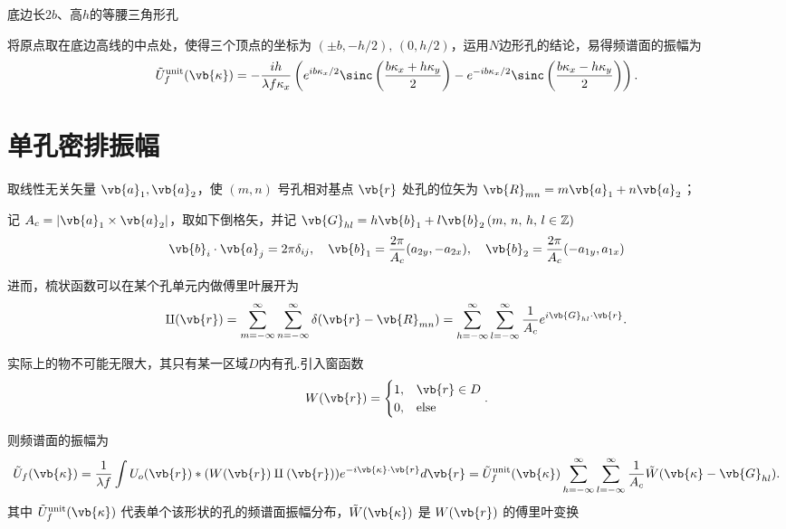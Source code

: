\begin{exbox}
	底边长\(2b\)、高\(h\)的等腰三角形孔

	将原点取在底边高线的中点处，使得三个顶点的坐标为 \((\pm b, -h/2),\,(0, h/2)\)，运用\(N\)边形孔的结论，易得频谱面的振幅为
	\begin{align*}
		\tilde{U}_f^{\text{unit}}(\vb{\kappa}) = -\frac{i h}{\lambda f \kappa_x} \left( e^{i b \kappa_x/2} \sinc\left(\frac{b \kappa_x + h \kappa_y}{2}\right) -  e^{-i b \kappa_x/2} \sinc\left(\frac{b \kappa_x - h \kappa_y}{2}\right) \right).
	\end{align*}
\end{exbox}

\section{单孔密排振幅}

取线性无关矢量 \(\vb{a}_1, \vb{a}_2\)，使 \((m, n)\) 号孔相对基点 \(\vb{r}\) 处孔的位矢为 \(\vb{R}_{mn} = m \vb{a}_1 + n \vb{a}_2\)；

记 \(A_c = |\vb{a}_1 \times \vb{a}_2|\)，取如下倒格矢，并记 \(\vb{G}_{hl} = h \vb{b}_1 + l \vb{b}_2\,(m,\,n,\,h,\,l\in \mathbb{Z})\)
\begin{align*}
	\vb{b}_i \cdot \vb{a}_j = 2\pi \delta_{ij}, \quad \vb{b}_1 = \frac{2\pi}{A_c} (a_{2y}, -a_{2x}), \quad \vb{b}_2 = \frac{2\pi}{A_c} (-a_{1y}, a_{1x})
\end{align*}


进而，梳状函数可以在某个孔单元内做傅里叶展开为
\begin{align*}
	\amalg(\vb{r}) = \sum_{m=-\infty}^{\infty} \sum_{n=-\infty}^{\infty} \delta(\vb{r} - \vb{R}_{mn}) = \sum_{h=-\infty}^{\infty} \sum_{l=-\infty}^{\infty} \frac{1}{A_c} e^{i \vb{G}_{hl} \cdot \vb{r}}.
\end{align*}

实际上的物不可能无限大，其只有某一区域\(D\)内有孔.引入窗函数
\begin{align*}
	W(\vb{r}) =
	\begin{cases}
		1, & \vb{r} \in D \\
		0, & \text{else}
	\end{cases}.
\end{align*}

则频谱面的振幅为
\begin{align*}
	\tilde{U}_f(\vb{\kappa}) = \frac{1}{\lambda f} \int U_o(\vb{r}) * (W(\vb{r}) \amalg(\vb{r})) e^{-i \vb{\kappa} \cdot \vb{r}} d\vb{r} = \tilde{U}_f^{\text{unit}}(\vb{\kappa}) \sum_{h=-\infty}^{\infty} \sum_{l=-\infty}^{\infty} \frac{1}{A_c} \tilde{W}(\vb{\kappa} - \vb{G}_{hl}).
\end{align*}
其中 \(\tilde{U}_f^{\text{unit}}(\vb{\kappa})\) 代表单个该形状的孔的频谱面振幅分布，\(\tilde{W}(\vb{\kappa})\) 是 \(W(\vb{r})\) 的傅里叶变换

